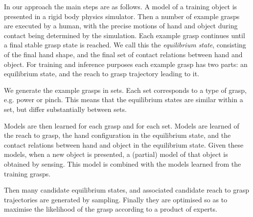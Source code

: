 In our approach the main steps are as follows. A model of a training object is presented in a rigid body physics simulator. Then a number of example grasps are executed by a human, with the precise motions of hand and object during contact being determined by the simulation. Each example grasp continues until a final stable grasp state is reached. We call this the {\em equilibrium state}, consisting of the final hand shape, and the final set of contact relations between hand and object. For training and inference purposes each example grasp has two parts: an equilibrium state, and the reach to grasp trajectory leading to it.

We generate the example grasps in sets. Each set corresponds to a type of grasp, e.g. power or pinch. This means that the equilibrium states are similar within a set, but differ substantially between sets. 

Models are then learned for each grasp and for each set. Models are learned of the reach to grasp, the hand configuration in the equilibrium state, and the contact relations between hand and object in the equilibrium state. Given these models, when a new object is presented, a (partial) model of that object is obtained by sensing. This model is combined with the models learned from the training grasps.

Then many candidate equilibrium states, and associated candidate reach to grasp trajectories are generated by sampling. Finally they are optimised so as to maximise the likelihood of the grasp according to a product of experts.